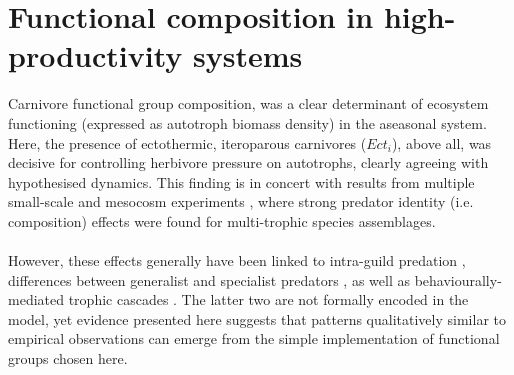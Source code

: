 \section{Functional composition in high-productivity systems}
Carnivore functional group composition, was a clear determinant of ecosystem functioning (expressed as autotroph biomass density) in the aseasonal system. 
Here, the presence of ectothermic, iteroparous carnivores ($Ect_i$), above all, was decisive for controlling herbivore pressure on autotrophs, clearly agreeing with hypothesised dynamics. 
This finding is in concert with results from multiple small-scale and mesocosm experiments \citep[e.g.][]{Finke2005, OConnor2008, Sanders2011}, where strong predator identity (i.e. composition) effects were found for multi-trophic species assemblages.\\\\
However, these effects generally have been  linked to intra-guild predation \citep{Ives2005}, differences between  generalist and specialist predators \citep{Duffy2007, Sanders2011}, as well as behaviourally-mediated trophic cascades \citep{Beschta2009, Schmitz2015}. 
The latter two are not formally encoded in the model, yet evidence presented here suggests that patterns qualitatively similar to empirical observations can emerge from the simple implementation of functional groups chosen here. 
